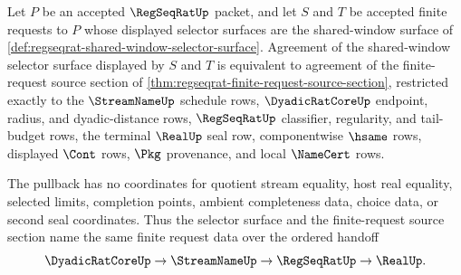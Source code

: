\begin{theorem}
\label{thm:regseqrat-tail-selector-section-pullback}
Let $P$ be an accepted $\RegSeqRatUp$ packet, and let $S$ and $T$ be accepted finite requests to $P$ whose displayed selector surfaces are the shared-window surface of \autoref{def:regseqrat-shared-window-selector-surface}. Agreement of the shared-window selector surface displayed by $S$ and $T$ is equivalent to agreement of the finite-request source section of \autoref{thm:regseqrat-finite-request-source-section}, restricted exactly to the $\StreamNameUp$ schedule rows, $\DyadicRatCoreUp$ endpoint, radius, and dyadic-distance rows, $\RegSeqRatUp$ classifier, regularity, and tail-budget rows, the terminal $\RealUp$ seal row, componentwise $\hsame$ rows, displayed $\Cont$ rows, $\Pkg$ provenance, and local $\NameCert$ rows.

The pullback has no coordinates for quotient stream equality, host real equality, selected limits, completion points, ambient completeness data, choice data, or second seal coordinates. Thus the selector surface and the finite-request source section name the same finite request data over the ordered handoff
$$
\DyadicRatCoreUp \to \StreamNameUp \to \RegSeqRatUp \to \RealUp .
$$
\end{theorem}
